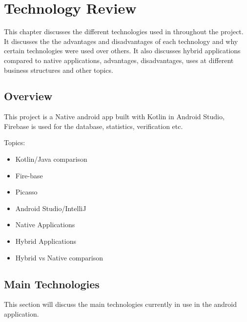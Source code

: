 \chapter{Technology Review}
This chapter discusses the different technologies used in throughout the
project. It discusses the the advantages and disadvantages of each technology 
and why certain technologies were used over others. It also discusses hybrid applications compared to native applications, advantages, disadvantages, uses at different business structures and other topics.

\section{Overview}
This project is a Native android app built with Kotlin in Android Studio, Firebase is used for the database, statistics, verification etc.

Topics:
\begin{itemize}
    \item Kotlin/Java comparison
    \item Fire-base
    \item Picasso
    \item Android Studio/IntelliJ
    \item Native Applications
    \item Hybrid Applications
    \item Hybrid vs Native comparison 
\end{itemize}
\newpage

\section{Main Technologies}
This section will discuss the main technologies currently in use in the android application.

